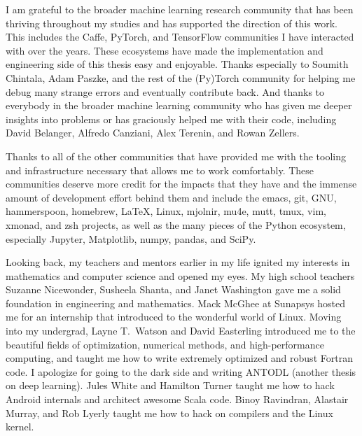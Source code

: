 \documentclass[12pt]{cmuthesis}
\begin{document}
\begin{acknowledgments}
  I am grateful to the broader machine learning research community
  that has been thriving throughout my studies and has
  supported the direction of this work.
  This includes the Caffe, PyTorch, and TensorFlow communities
  I have interacted with over the years.
  These ecosystems have made the implementation and engineering
  side of this thesis easy and enjoyable.
  Thanks especially to Soumith Chintala, Adam Paszke, and the rest
  of the (Py)Torch community for helping me debug many strange
  errors and eventually contribute back.
  And thanks to everybody in the broader machine learning community
  who has given me deeper insights into problems or has graciously
  helped me with their code, including
  David Belanger,
  Alfredo Canziani,
  Alex Terenin, and
  Rowan Zellers.

  Thanks to all of the other communities that have provided me
  with the tooling and infrastructure necessary that allows
  me to work comfortably. These communities deserve more credit
  for the impacts that they have and the immense amount of
  development effort behind them and include the
  emacs, git, GNU, hammerspoon, homebrew, \LaTeX, Linux, mjolnir,
  mu4e, mutt, tmux, vim, xmonad, and zsh projects,
  as well as the many pieces of the Python ecosystem, especially
  Jupyter,
  Matplotlib,
  numpy,
  pandas, and
  SciPy.

  Looking back, my teachers and mentors earlier in my life
  ignited my interests in mathematics and computer science
  and opened my eyes.
  My high school teachers
  Suzanne Nicewonder,
  Susheela Shanta, and
  Janet Washington gave me a solid foundation
  in engineering and mathematics.
  Mack McGhee at Sunapsys hosted me for an
  internship that introduced to the wonderful
  world of Linux.
  Moving into my undergrad,
  Layne T.~Watson and David Easterling
  introduced me to the beautiful fields
  of optimization, numerical methods, and
  high-performance computing, and taught me how to
  write extremely optimized and robust Fortran code.
  I apologize for going to the dark side and writing
  ANTODL (another thesis on deep learning).
  Jules White and Hamilton Turner taught me how
  to hack Android internals and architect awesome Scala code.
  Binoy Ravindran, Alastair Murray, and Rob Lyerly
  taught me how to hack on compilers
  and the Linux kernel.


\end{acknowledgments}
\end{document}
